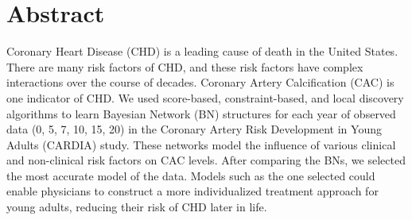 \section{Abstract}
\begin{comment}


We created a Bayesian Network that models and tracks human behavior.  The data set that we used consists of health records from 5,115 black and white, males and females, ages 18-30, called CARDIA data.\cite{Friedman1988}  Using the CARDIA data we were able to track behavioral changes amongst patients, through the implementation of our Bayesian Network.  Our Network then, modeled these changes and made statistical inferences based off different attributes within our network.  These inferences can aid physicians in building a patient specific decision support model. Hospitals can then use these decision support models to produce a more personalized medical approach for treating their patients.
\end{comment}


Coronary Heart Disease (CHD) is a leading cause of death in the United States. There are many risk factors of CHD, and these risk factors have complex interactions over the course of decades. Coronary Artery Calcification (CAC) is one indicator of CHD. We used score-based, constraint-based, and local discovery algorithms to learn Bayesian Network (BN) structures for each year of observed data (0, 5, 7, 10, 15, 20) in the Coronary Artery Risk Development in Young Adults (CARDIA) study. These networks model the influence of various clinical and non-clinical risk factors on CAC levels. After comparing the BNs, we selected the most accurate model of the data. Models such as the one selected could enable physicians to construct a more individualized treatment approach for young adults, reducing their risk of CHD later in life.  